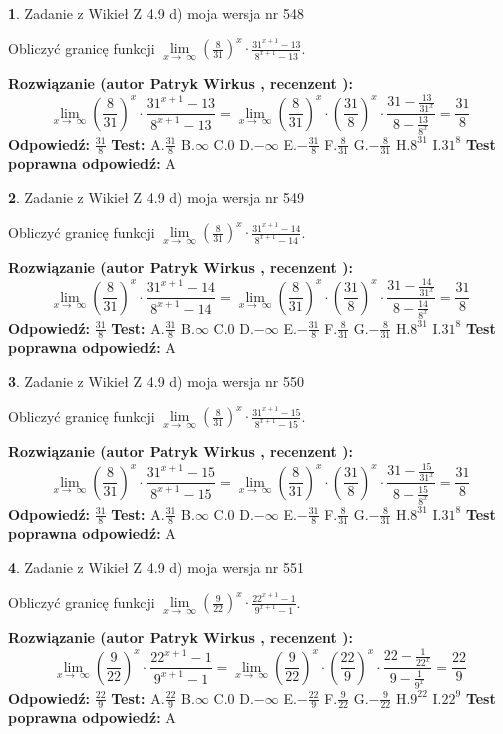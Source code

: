 \documentclass[12pt, a4paper]{article}
\theoremstyle{definition} %
\newtheorem{zad}{}
\newcommand{\zadStart}[1]{\begin{zad}#1\newline}
\newcommand{\zadStop}{\end{zad}}
\newcommand{\rozwStart}[2]{\noindent \textbf{Rozwiązanie (autor #1 , recenzent #2): }\newline}
\newcommand{\rozwStop}{\newline}
\newcommand{\odpStart}{\noindent \textbf{Odpowiedź:}\newline}
\newcommand{\odpStop}{\newline}
\newcommand{\testStart}{\noindent \textbf{Test:}\newline}
\newcommand{\testStop}{\newline}
\newcommand{\kluczStart}{\noindent \textbf{Test poprawna odpowiedź:}\newline}
\newcommand{\kluczStop}{\newline}
\begin{document}
\zadStart{Zadanie z Wikieł Z 4.9 d) moja wersja nr 548}


Obliczyć granicę funkcji  $\lim\limits_{x\to\ \infty}(\frac{8}{31})^{x}\cdot\frac{31^{x+1}-13}{8^{x+1}-13}$.
\zadStop
\rozwStart{Patryk Wirkus}{}
$$\lim\limits_{x\to\ \infty}(\frac{8}{31})^{x}\cdot\frac{31^{x+1}-13}{8^{x+1}-13}=\lim\limits_{x\to\ \infty}(\frac{8}{31})^{x}\cdot(\frac{31}{8})^{x} \cdot \frac{31-\frac{13}{31^{x}}}{8-\frac{13}{8^{x}}} = \frac{31}{8}$$
\rozwStop
\odpStart
$\frac{31}{8}$
\odpStop
\testStart
A.$\frac{31}{8}$ B.$\infty$ C.$0$ D.$-\infty$ E.$-\frac{31}{8}$
F.$\frac{8}{31}$ G.$-\frac{8}{31}$
H.$8^{31}$
I.$31^{8}$
\testStop
\kluczStart
A
\kluczStop



\zadStart{Zadanie z Wikieł Z 4.9 d) moja wersja nr 549}


Obliczyć granicę funkcji  $\lim\limits_{x\to\ \infty}(\frac{8}{31})^{x}\cdot\frac{31^{x+1}-14}{8^{x+1}-14}$.
\zadStop
\rozwStart{Patryk Wirkus}{}
$$\lim\limits_{x\to\ \infty}(\frac{8}{31})^{x}\cdot\frac{31^{x+1}-14}{8^{x+1}-14}=\lim\limits_{x\to\ \infty}(\frac{8}{31})^{x}\cdot(\frac{31}{8})^{x} \cdot \frac{31-\frac{14}{31^{x}}}{8-\frac{14}{8^{x}}} = \frac{31}{8}$$
\rozwStop
\odpStart
$\frac{31}{8}$
\odpStop
\testStart
A.$\frac{31}{8}$ B.$\infty$ C.$0$ D.$-\infty$ E.$-\frac{31}{8}$
F.$\frac{8}{31}$ G.$-\frac{8}{31}$
H.$8^{31}$
I.$31^{8}$
\testStop
\kluczStart
A
\kluczStop



\zadStart{Zadanie z Wikieł Z 4.9 d) moja wersja nr 550}


Obliczyć granicę funkcji  $\lim\limits_{x\to\ \infty}(\frac{8}{31})^{x}\cdot\frac{31^{x+1}-15}{8^{x+1}-15}$.
\zadStop
\rozwStart{Patryk Wirkus}{}
$$\lim\limits_{x\to\ \infty}(\frac{8}{31})^{x}\cdot\frac{31^{x+1}-15}{8^{x+1}-15}=\lim\limits_{x\to\ \infty}(\frac{8}{31})^{x}\cdot(\frac{31}{8})^{x} \cdot \frac{31-\frac{15}{31^{x}}}{8-\frac{15}{8^{x}}} = \frac{31}{8}$$
\rozwStop
\odpStart
$\frac{31}{8}$
\odpStop
\testStart
A.$\frac{31}{8}$ B.$\infty$ C.$0$ D.$-\infty$ E.$-\frac{31}{8}$
F.$\frac{8}{31}$ G.$-\frac{8}{31}$
H.$8^{31}$
I.$31^{8}$
\testStop
\kluczStart
A
\kluczStop



\zadStart{Zadanie z Wikieł Z 4.9 d) moja wersja nr 551}


Obliczyć granicę funkcji  $\lim\limits_{x\to\ \infty}(\frac{9}{22})^{x}\cdot\frac{22^{x+1}-1}{9^{x+1}-1}$.
\zadStop
\rozwStart{Patryk Wirkus}{}
$$\lim\limits_{x\to\ \infty}(\frac{9}{22})^{x}\cdot\frac{22^{x+1}-1}{9^{x+1}-1}=\lim\limits_{x\to\ \infty}(\frac{9}{22})^{x}\cdot(\frac{22}{9})^{x} \cdot \frac{22-\frac{1}{22^{x}}}{9-\frac{1}{9^{x}}} = \frac{22}{9}$$
\rozwStop
\odpStart
$\frac{22}{9}$
\odpStop
\testStart
A.$\frac{22}{9}$ B.$\infty$ C.$0$ D.$-\infty$ E.$-\frac{22}{9}$
F.$\frac{9}{22}$ G.$-\frac{9}{22}$
H.$9^{22}$
I.$22^{9}$
\testStop
\kluczStart
A
\kluczStop
\end{document}
